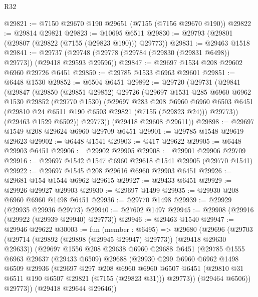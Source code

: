 \begin{lexlean}{R32}
\begin{coremodule}
@29821 := @7150 @29670 @190 @29651 (@7155 (@7156 @29670 @190))
@29822 := @29814 @29821
@29823 := @10695 @6511
@29830 := @29793 (@29801 (@29807 (@29822 (@7155 (@29823 @190))) @29773))
@29831 := @29463 @1518
@29841 := @29737 (@29748 (@29778 (@29784 (@29830 (@29831 @6498)) @29773)) (@29418 @29593 @29596))
@29847 := @29697 @1534 @208 @29602 @6960 @29726 @6451
@29850 := @29785 @1533 @6963 @29601
@29851 := @6448 @1530
@29852 := @6504 @6451
@29892 := @29720
    (@29731
      (@29841
        (@29847
          (@29850
            (@29851 @29852)
            @29726
            (@29697
              @1531
              @285
              @6960
              @6962
              @1530
              @29852
              (@29770 @1530)
              (@29697
                @283
                @208
                @6960
                @6960
                @6503
                @6451
                (@29810 @24 @6511 @190 @6503 @29821 (@7155 (@29823 @24)))
                @29773))
            (@29463 @1529 @6502))
          @29773))
      (@29418 @29608 @29611))
@29898 := @29697 @1549 @208 @29624 @6960 @29709 @6451
@29901 := @29785 @1548 @29619 @29623
@29902 := @6448 @1541
@29903 := @417 @29622
@29905 := @6448 @29903 @6451
@29906 := @29902 @29905
@29908 := @29901 @29906 @29709
@29916 := @29697 @1542 @1547 @6960 @29618 @1541 @29905 (@29770 @1541)
@29922 := @29697 @1545 @208 @29616 @6960 @29903 @6451
@29926 := @29681 @154 @1544 @6962 @29615
@29927 := @29433 @6451
@29929 := @29926 @29927 @29903
@29930 := @29697 @1499
@29935 := @29930 @208 @6960 @6960 @1498 @6451
@29936 := @29770 @1498
@29939 := @29929 (@29935 @29936 @29773)
@29940 := @27602 @1497
@29945 := @29908 (@29916 (@29922 (@29939 @29940) @29773))
@29946 := @29463 @1540
@29947 := @29946 @29622
@30003 := fun (member : @6495) =>
  @29680
    (@29696
      (@29703
        (@29714 (@29892 (@29898 (@29945 @29947) @29773)) (@29418 @29630 @29633))
        (@29697
          @1556
          @208
          @29638
          @6960
          @29688
          @6451
          (@29785
            @1555
            @6963
            @29637
            (@29433 @6509)
            @29688
            (@29930
              @299
              @6960
              @6962
              @1498
              @6509
              @29936
              (@29697
                @297
                @208
                @6960
                @6960
                @6507
                @6451
                (@29810 @31 @6511 @190 @6507 @29821 (@7155 (@29823 @31)))
                @29773))
            (@29464 @6506))
          @29773))
      (@29418 @29644 @29646))

\end{coremodule}
\end{lexlean}
